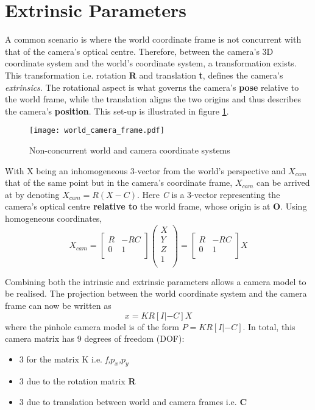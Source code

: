 \documentclass[12pt]{article}
\begin{document}
\section*{Extrinsic Parameters}
A common scenario is where the world coordinate frame is not concurrent with that of the camera's optical centre. Therefore, between the camera's 3D coordinate system and the world's coordinate system, a transformation exists. This transformation i.e. rotation \textbf{R} and translation \textbf{t}, defines the camera's \textit{extrinsics}. The rotational aspect is what governs the camera's \textbf{pose} relative to the world frame, while the translation aligns the two origins and thus describes the camera's \textbf{position}. This set-up is illustrated in figure \ref{fig:Frames}.
\begin {figure}
	\centering
\texttt{[image: world\_camera\_frame.pdf]}
\caption{Non-concurrent world and camera coordinate systems}
\label{fig:Frames}
\end{figure}
\FloatBarrier
With X being an inhomogeneous 3-vector from the world's perspective and $X_{cam}$  that of the same point but in the camera's coordinate frame, $X_{cam}$ can be arrived at by denoting $X_{cam} = R(X - C)$. Here \textit{C} is a 3-vector representing the camera's optical centre \textbf{relative to} the world frame, whose origin is at \textbf{O}. Using homogeneous coordinates,
\begin{equation}
X_{cam} = \left[ {\begin{array}{cc}
R & -RC\\
0 &  1 \\
\end{array} }\right] \left( \begin{array}{c} X \\ Y \\ Z \\ 1 \\ \end{array} \right) = 
\left[ {\begin{array}{cc}
R & -RC\\
0 &  1 \\
\end{array} }\right]X
\end{equation}

Combining both the intrinsic and extrinsic parameters allows a camera model to be realised. The projection between the world coordinate system and the camera frame can now be written as
\begin{equation}
x = KR[I|-C]X
\end{equation} 
where the pinhole camera model is of the form $P = KR[I|-C] $. In total, this camera matrix has 9 degrees of freedom (DOF):
\begin{itemize}
\item 3 for the matrix K i.e. \textit{f,$p_x$,$p_y$}
\item 3 due to the rotation matrix \textbf{R}
\item 3 due to translation between world and camera frames i.e. \textbf{C}
\end{itemize}
\end{document}
